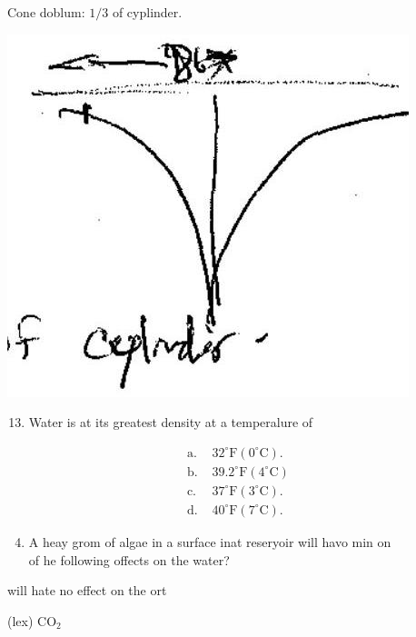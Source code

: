 \documentclass[10pt]{article}
\begin{document}
Cone doblum: $1 / 3$ of cyplinder.

\includegraphics[max width=\textwidth]{2022_11_11_ca6a6c1a0324ee23e523g-02(3)}

\begin{enumerate}
  \setcounter{enumi}{12}
  \item Water is at its greatest density at a temperalure of
\end{enumerate}

$$
\begin{array}{ll}
\text { a. } & 32^{\circ} \mathrm{F}\left(0^{\circ} \mathrm{C}\right) . \\
\text { b. } & 39.2^{\circ} \mathrm{F}\left(4^{\circ} \mathrm{C}\right) \\
\text { c. } & 37^{\circ} \mathrm{F}\left(3^{\circ} \mathrm{C}\right) . \\
\text { d. } & 40^{\circ} \mathrm{F}\left(7^{\circ} \mathrm{C}\right) .
\end{array}
$$

\begin{enumerate}
  \setcounter{enumi}{3}
  \item A heay grom of algae in a surface inat reseryoir will havo min on\\
of he following offects on the water?
\end{enumerate}

will hate no effect on the ort

(lex) $\mathrm{CO}_{2}$
\end{document}
